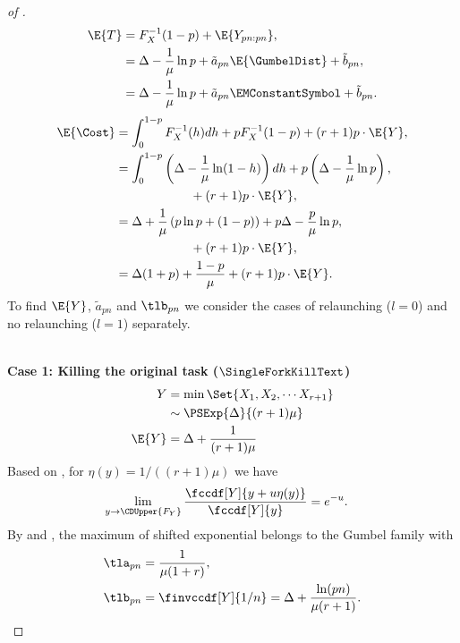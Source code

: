 \begin{proof}[of ]
\begin{align}
\E{T} &= F_X^{-1}(1-p) + \E{ Y_{pn:pn}} \nonumber ,\\
&= \Delta - \frac{1}{\mu} \ln p + \tilde{a}_{pn} \E{ \GumbelDist} + \tilde{b}_{pn},\\
&= \Delta - \frac{1}{\mu} \ln p + \tilde{a}_{pn} \EMConstantSymbol + \tilde{b}_{pn}.
\end{align}
\begin{align}
\E{\Cost} &= \int_{0}^{1-p} F_X^{-1}(h) dh + p F_X^{-1}(1-p)  + (r+1) p \cdot \E{Y}, \\
&= \int_{0}^{1-p}\left ( \Delta - \frac{1}{\mu} \ln(1-h) \right) dh + p \left(\Delta - \frac{1}{\mu} \ln p \right) \nonumber,\\
& \quad \quad \quad \quad  \quad \quad+  (r+1)p \cdot \E{Y} ,\\
&= \Delta + \frac{1}{\mu} \left( p \ln p + (1-p) \right)  + p \Delta - \frac{p}{\mu} \ln p \nonumber ,\\
&\quad \quad \quad \quad  \quad \quad+ (r+1)p \cdot \E{Y} ,\\
&= \Delta (1 + p) + \frac{1-p}{\mu} + (r+1)p \cdot \E{Y} .
\end{align}
To find $\E{Y}$, $\tilde{a}_{pn}$ and  $\tlb_{pn}$ we consider the cases of relaunching ($l=0$) and no relaunching ($l=1$) separately. 

~\\
\textbf{Case 1: Killing the original task ($\SingleForkKillText$)}
\begin{align}
Y &= \min \Set{ X_1, X_2, \cdots X_{r+1} } \\
&\sim \PSExp{\Delta}{(r+1)\mu} \\
\E{Y} &= \Delta + \frac{1}{(r+1)\mu}
\end{align}
Based on , for $ \eta(y) = 1/((r+1)\mu)$ we have
\begin{align}
    \lim_{y \rightarrow \CDUpper{F_Y}} \frac{\fccdf[Y]{y + u \eta(y)}}{\fccdf[Y]{y}}
    &= e^{-u}.
\end{align}
By  and , the maximum of shifted exponential belongs to the Gumbel family with
\begin{align*}
    \tla_{pn} &= \frac{1}{\mu(1+r) },
    \\
    \tlb_{pn} &= \finvccdf[Y]{1/n} = \Delta + \frac{\ln (pn) }{\mu(r+1)}.
\end{align*}


\end{proof}
